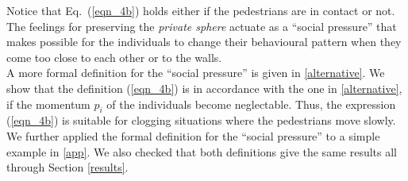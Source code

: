 Notice that Eq.~(\ref{eqn_4b}) holds either if the pedestrians are in 
contact or not. The feelings for preserving the \textit{private sphere} 
actuate as a ``social pressure'' that makes possible for the individuals to 
change their behavioural pattern when they come too close to each other or to 
the walls.\\

A more formal definition for the ``social pressure'' is given in
\ref{alternative}. We show that the definition (\ref{eqn_4b}) is in accordance with the 
one in \ref{alternative}, if the momentum $p_i$ of the individuals become 
neglectable. Thus, the expression (\ref{eqn_4b}) is suitable for clogging 
situations where the pedestrians move slowly. \\

We further applied the formal definition for the ``social pressure'' to a 
simple example in \ref{app}. We also checked that both definitions 
give the same results all through Section \ref{results}. \\


